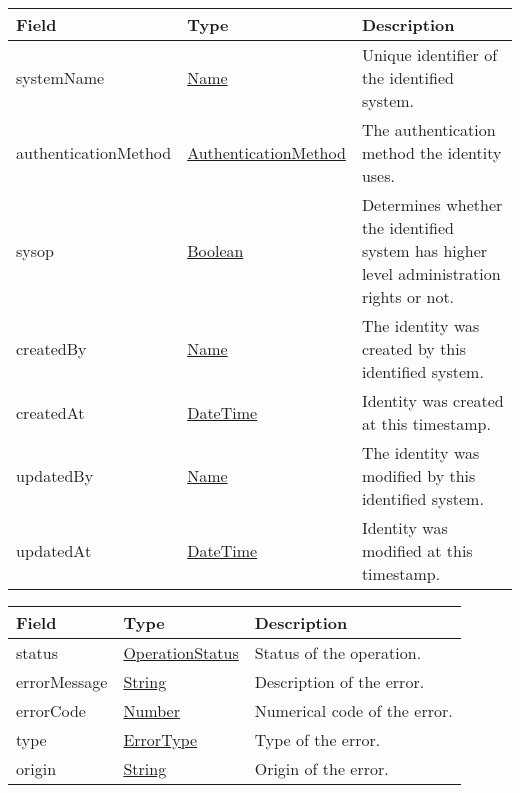 \documentclass[a4paper]{arrowhead}
\newcommand{\pref}[1]{{\textcolor{ArrowheadGrey}{\hyperref[sec:model:primitives:#1]{#1}}}}
\begin{document}
 
\begin{table}[ht!]
\begin{tabularx}{\textwidth}{| p{3.3cm} | p{4cm} | X |} \hline
\rowcolor{gray!33} Field & Type      & Description \\ \hline
systemName & \pref{Name} & Unique identifier of the identified system. \\ \hline
authenticationMethod & \pref{AuthenticationMethod} & The authentication method the identity uses. \\ \hline
sysop & \pref{Boolean} & Determines whether the identified system has higher level administration rights or not. \\ \hline
createdBy & \pref{Name} & The identity was created by this identified system. \\ \hline
createdAt & \pref{DateTime} & Identity was created at this timestamp. \\ \hline
updatedBy & \pref{Name} & The identity was modified by this identified system. \\ \hline
updatedAt & \pref{DateTime} & Identity was modified at this timestamp. \\ \hline
\end{tabularx}
\end{table}


\begin{table}[ht!]
\begin{tabularx}{\textwidth}{| p{2.5cm} | p{3cm} | X |} \hline
\rowcolor{gray!33} Field & Type      & Description \\ \hline
status & \pref{OperationStatus} & Status of the operation. \\ \hline
errorMessage & \pref{String} & Description of the error. \\ \hline
errorCode &\pref{Number}  & Numerical code of the error. \\ \hline
type & \pref{ErrorType} & Type of the error. \\ \hline
origin & \pref{String} & Origin of the error. \\ \hline
\end{tabularx}
\end{table}

 
\end{document}
